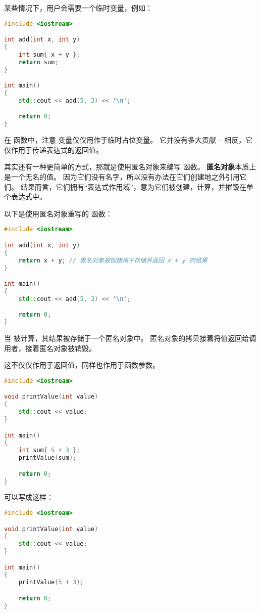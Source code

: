 \documentclass[../../LearnCpp.tex]{subfiles}
\begin{document}

某些情况下，用户会需要一个临时变量，例如：

\begin{lstlisting}[language=C++]
#include <iostream>

int add(int x, int y)
{
    int sum{ x + y };
    return sum;
}

int main()
{
    std::cout << add(5, 3) << '\n';

    return 0;
}
\end{lstlisting}

在  函数中，注意  变量仅仅用作于临时占位变量。
它并没有多大贡献 -- 相反，它仅作用于传递表达式的返回值。

其实还有一种更简单的方式，那就是使用匿名对象来编写 函数。
\textbf{匿名对象}本质上是一个无名的值。
因为它们没有名字，所以没有办法在它们创建地之外引用它们。
结果而言，它们拥有“表达式作用域”，意为它们被创建，计算，并摧毁在单个表达式中。

以下是使用匿名对象重写的  函数：

\begin{lstlisting}[language=C++]
#include <iostream>

int add(int x, int y)
{
    return x + y; // 匿名对象被创建用于存储并返回 x + y 的结果
}

int main()
{
    std::cout << add(5, 3) << '\n';

    return 0;
}
\end{lstlisting}

当  被计算，其结果被存储于一个匿名对象中。
匿名对象的拷贝接着将值返回给调用者，接着匿名对象被销毁。

这不仅仅作用于返回值，同样也作用于函数参数。

\begin{lstlisting}[language=C++]
#include <iostream>

void printValue(int value)
{
    std::cout << value;
}

int main()
{
    int sum{ 5 + 3 };
    printValue(sum);

    return 0;
}
\end{lstlisting}

可以写成这样：

\begin{lstlisting}[language=C++]
#include <iostream>

void printValue(int value)
{
    std::cout << value;
}

int main()
{
    printValue(5 + 3);

    return 0;
}
\end{lstlisting}
\end{document}
